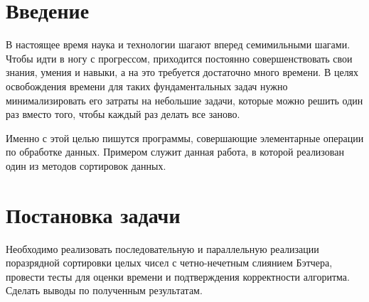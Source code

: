 \documentclass{report}
\begin{document}
	\setcounter{page}{2}
	
	\tableofcontents
	\newpage
	
	\section*{Введение}
	В настоящее время наука и технологии шагают вперед семимильными шагами. Чтобы идти в ногу с прогрессом, приходится постоянно совершенствовать свои знания, умения и навыки, а на это требуется достаточно много времени. В целях освобождения времени для таких фундаментальных задач нужно минимализировать его затраты на небольшие задачи, которые можно решить один раз вместо того, чтобы каждый раз делать все заново.
	\par Именно с этой целью пишутся программы, совершающие элементарные операции по обработке данных. Примером служит данная работа, в которой реализован один из методов сортировок данных.
	\newpage
	
	\section*{Постановка задачи}
	Необходимо реализовать последовательную и параллельную реализации поразрядной сортировки целых чисел с четно-нечетным слиянием Бэтчера, провести тесты для оценки времени и подтверждения корректности алгоритма. Сделать выводы по полученным результатам.
	\newpage
	
\end{document}
